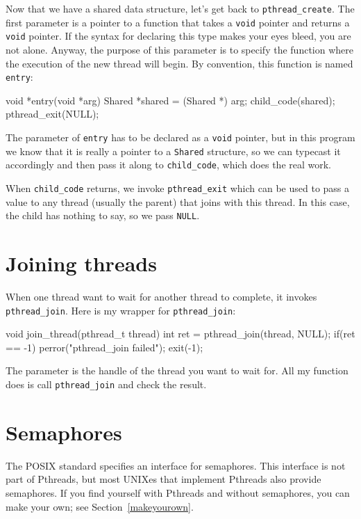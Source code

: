 \documentclass{book}
\begin{document}
Now that we have a shared data structure, let's get back to
    {\tt pthread\_create}.
The first parameter is a pointer to a function that takes
a {\tt void} pointer and returns a {\tt void} pointer.  If the syntax
for declaring this type makes your eyes bleed, you are not alone.
Anyway, the purpose of this parameter is to specify the function where
the execution of the new thread will begin.  By convention, this
function is named {\tt entry}:

\begin{unbreakable}[title={}]{}
void *entry(void *arg) {
  Shared *shared = (Shared *) arg;
  child_code(shared);
  pthread_exit(NULL);
}
\end{unbreakable}

The parameter of {\tt entry} has to be declared as a {\tt void}
pointer, but in this program we know that it is really a pointer to a
    {\tt Shared} structure, so we can typecast it accordingly and then
pass it along to {\tt child\_code}, which does the real work.

When {\tt child\_code} returns, we invoke {\tt pthread\_exit}
which can be used to pass a value to any thread (usually the
parent) that joins with this thread.  In this case, the child
has nothing to say, so we pass {\tt NULL}.


\section{Joining threads}

When one thread want to wait for another thread to complete,
it invokes {\tt pthread\_join}.
Here is my wrapper for {\tt pthread\_join}:

\begin{unbreakable}[title={}]{}
void join_thread(pthread_t thread) {
  int ret = pthread_join(thread, NULL);
  if(ret == -1) {
    perror("pthread_join failed");
    exit(-1);
  }
}
\end{unbreakable}

The parameter is the handle of the thread you want to wait for.
All my function does is call {\tt pthread\_join} and check the
result.


\section{Semaphores}

The POSIX standard specifies an interface for semaphores.
This interface is not part of Pthreads, but most UNIXes
that implement Pthreads also provide semaphores.  If you
find yourself with Pthreads and without semaphores, you
can make your own; see Section~\ref{makeyourown}.
\end{document}
